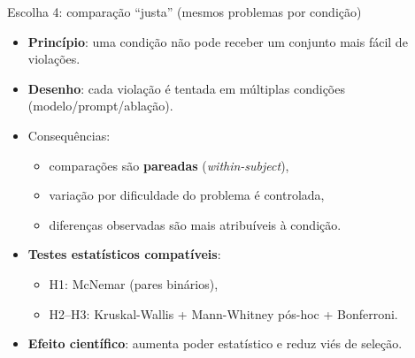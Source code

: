 \documentclass[aspectratio=169]{beamer}
\begin{document}
\begin{frame}{Escolha 4: comparação ``justa'' (mesmos problemas por condição)}
\small
\begin{itemize}
  \item \textbf{Princípio}: uma condição não pode receber um conjunto mais fácil de violações.
  \item \textbf{Desenho}: cada violação é tentada em múltiplas condições
        (modelo/prompt/ablação).
  \item Consequências:
  \begin{itemize}
    \item comparações são \textbf{pareadas} (\emph{within-subject}),
    \item variação por dificuldade do problema é controlada,
    \item diferenças observadas são mais atribuíveis à condição.
  \end{itemize}
  \item \textbf{Testes estatísticos compatíveis}:
  \begin{itemize}
    \item H1: McNemar (pares binários),
    \item H2--H3: Kruskal-Wallis + Mann-Whitney pós-hoc + Bonferroni.
  \end{itemize}
  \item \textbf{Efeito científico}: aumenta poder estatístico e reduz viés de seleção.
\end{itemize}
\end{frame}
\end{document}
